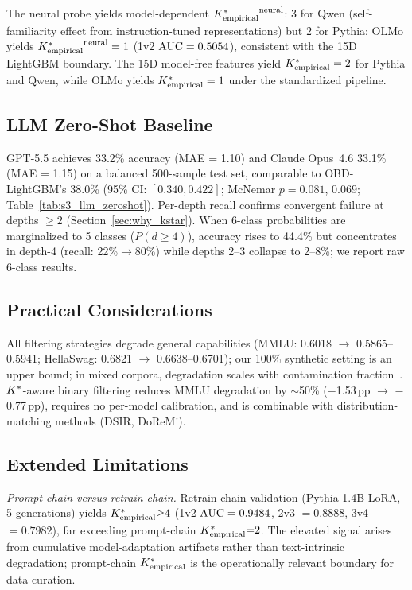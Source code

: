 The neural probe yields model-dependent ${K^*_{\text{empirical}}}^{\text{neural}}$: $3$ for Qwen (self-familiarity effect from instruction-tuned representations) but $2$ for Pythia; OLMo yields ${K^*_{\text{empirical}}}^{\text{neural}} = 1$ (1v2 $\text{AUC} = 0.5054$), consistent with the 15D LightGBM boundary.
The 15D model-free features yield ${K^*_{\text{empirical}}} = 2$ for Pythia and Qwen, while OLMo yields ${K^*_{\text{empirical}}} = 1$ under the standardized pipeline.

\subsection{LLM Zero-Shot Baseline}
\label{sec:extended_llm}

GPT-5.5 achieves 33.2\% accuracy (MAE = 1.10) and Claude Opus~4.6 33.1\% (MAE = 1.15) on a balanced 500-sample test set, comparable to OBD-LightGBM's 38.0\% (95\% CI: $[0.340, 0.422]$; McNemar $p = 0.081$, $0.069$; Table~\ref{tab:s3_llm_zeroshot}).
Per-depth recall confirms convergent failure at depths $\geq 2$ (Section~\ref{sec:why_kstar}).
When 6-class probabilities are marginalized to 5 classes ($P(d{\geq}4)$), accuracy rises to 44.4\% but concentrates in depth-4 (recall: 22\%$\to$80\%) while depths 2--3 collapse to 2--8\%; we report raw 6-class results.

\subsection{Practical Considerations}

All filtering strategies degrade general capabilities (MMLU: 0.6018 $\to$ 0.5865--0.5941; HellaSwag: 0.6821 $\to$ 0.6638--0.6701); our 100\% synthetic setting is an upper bound; in mixed corpora, degradation scales with contamination fraction~\cite{shumailov2024collapse, dohmatob2024model}.
${K^*}$-aware binary filtering reduces MMLU degradation by ${\sim}$50\% ($-$1.53\,pp $\to$ $-$0.77\,pp), requires no per-model calibration, and is combinable with distribution-matching methods (DSIR, DoReMi).

\subsection{Extended Limitations}
\label{sec:extended_limitations}

\emph{Prompt-chain versus retrain-chain.}
Retrain-chain validation (Pythia-1.4B LoRA, 5 generations) yields ${K^*_{\text{empirical}}}{\geq}4$ (1v2 $\text{AUC} = 0.9484$, 2v3 $= 0.8888$, 3v4 $= 0.7982$), far exceeding prompt-chain ${K^*_{\text{empirical}}}{=}2$.
The elevated signal arises from cumulative model-adaptation artifacts rather than text-intrinsic degradation; prompt-chain ${K^*_{\text{empirical}}}$ is the operationally relevant boundary for data curation.

